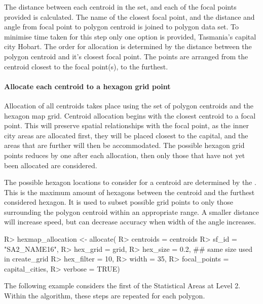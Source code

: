 \documentclass[
]{jss}
\begin{document}
The distance between each centroid in the set, and each of the focal
points provided is calculated. The name of the closest focal point, and
the distance and angle from focal point to polygon centroid is joined to
polygon data set. To minimise time taken for this step only one option
is provided, Tasmania's capital city Hobart. The order for allocation is
determined by the distance between the polygon centroid and it's closest
focal point. The points are arranged from the centroid closest to the
focal point(s), to the furthest.

\hypertarget{allocate-each-centroid-to-a-hexagon-grid-point}{%
\paragraph{Allocate each centroid to a hexagon grid
point}\label{allocate-each-centroid-to-a-hexagon-grid-point}}

Allocation of all centroids takes place using the set of polygon
centroids and the hexagon map grid. Centroid allocation begins with the
closest centroid to a focal point. This will preserve spatial
relationships with the focal point, as the inner city areas are
allocated first, they will be placed closest to the capital, and the
areas that are further will then be accommodated. The possible hexagon
grid points reduces by one after each allocation, then only those that
have not yet been allocated are considered.

The possible hexagon locations to consider for a centroid are determined
by the . This is the maximum amount of hexagons between
the centroid and the furthest considered hexagon. It is used to subset
possible grid points to only those surrounding the polygon centroid
within an appropriate range. A smaller distance will increase speed, but
can decrease accuracy when width of the angle increases.

\begin{CodeChunk}

\begin{CodeInput}
R> hexmap_allocation <- allocate(
R>   centroids = centroids %
R>   sf_id = "SA2_NAME16",
R>   hex_grid = grid,
R>   hex_size = 0.2, ## same size used in create_grid
R>   hex_filter = 10,
R>   width = 35,
R>   focal_points = capital_cities,
R>   verbose = TRUE)
\end{CodeInput}
\end{CodeChunk}

The following example considers the first of the Statistical Areas at
Level 2. Within the algorithm, these steps are repeated for each
polygon.
\end{document}
